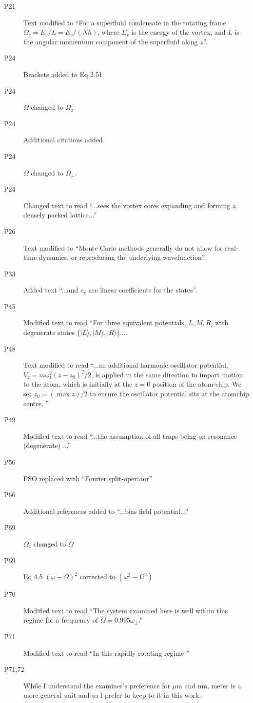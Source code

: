 \documentclass[paper=a4, fontsize=12pt]{scrartcl}
\begin{document}
\begin{description}
    \item [P21] Text modified to ``For a superfluid condensate in the rotating frame $\Omega_c = {E_v/L} = {E_v/(N\hbar)}$, where $E_v$ is the energy of the vortex, and $L$ is the angular momentum component of the superfluid along $z$''.
    \item [P24] Brackets added to Eq 2.51
    \item [P24] $\Omega$ changed to ${\Omega}_z$
    \item [P24] Additional citations added.
    \item [P24] $\Omega$ changed to $\Omega_\perp$.
    \item [P24] Changed text to read ``...sees the vortex cores expanding and forming a densely packed lattice...''
    \item [P26] Text modified to ``Monte Carlo methods generally do not allow for real-time dynamics, or reproducing the underlying wavefunction''.
    \item [P33] Added text ``...and $c_{\textrm{x}}$ are linear coefficients for the states''.
    \item [P45] Modified text to read ``For three equivalent potentials, $L,M,R$, with degenerate states $\{|L \rangle,|M\rangle,|R\rangle\}...$.
    \item [P48] Text modified to read ``...an additional harmonic oscillator potential, $V_z = m\omega_z^2 (z-z_0)^2/2$, is applied in the same direction to impart motion to the atom, which is initially at the $z=0$ position of the atom-chip. We set $z_0 = (\max z)/2$ to ensure the oscillator potential sits at the atomchip centre. ''
    \item [P49] Modified text to read ``...the assumption of all traps being on resonance (degenerate) ...''
    \item [P56] FSO replaced with ``Fourier split-operator''
    \item [P66] Additional references added to ``...bias field potential...''
    \item [P69] $\Omega_z$ changed to $\Omega$
    \item [P69] Eq 4.5 $(\omega - \Omega)^2$ corrected to $(\omega^2 - \Omega^2)$
    \item [P70] Modified text to read ``The system examined here is well within this regime for a frequency of $\Omega = 0.995\omega_\perp$.''
    \item [P71] Modified text to read ``In this rapidly rotating regime ''
    \item [P71,72] While I understand the examiner's preference for $\mu$m and nm, meter is a more general unit and so I prefer to keep to it in this work.

\end{description}
\end{document}
